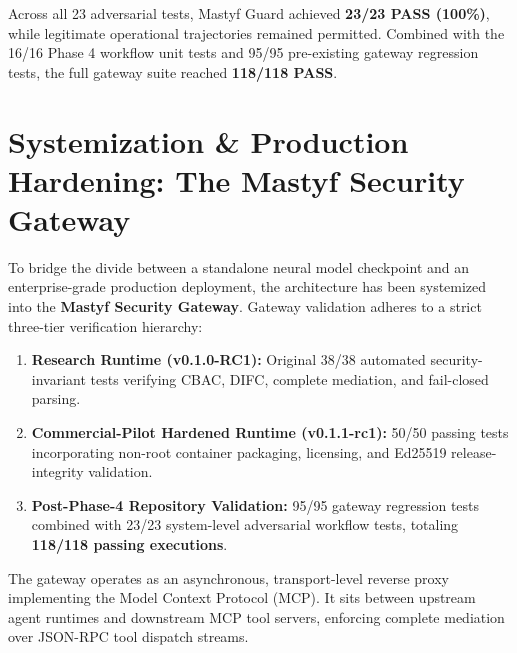 \documentclass[10pt,journal,compsoc]{IEEEtran}
\begin{document}
Across all 23 adversarial tests, Mastyf Guard achieved \textbf{23/23 PASS (100\%)}, while legitimate operational trajectories remained permitted. Combined with the 16/16 Phase 4 workflow unit tests and 95/95 pre-existing gateway regression tests, the full gateway suite reached \textbf{118/118 PASS}.

\section{Systemization \& Production Hardening: The Mastyf Security Gateway}
To bridge the divide between a standalone neural model checkpoint and an enterprise-grade production deployment, the architecture has been systemized into the \textbf{Mastyf Security Gateway}. Gateway validation adheres to a strict three-tier verification hierarchy:
\begin{enumerate}
    \item \textbf{Research Runtime (v0.1.0-RC1):} Original 38/38 automated security-invariant tests verifying CBAC, DIFC, complete mediation, and fail-closed parsing.
    \item \textbf{Commercial-Pilot Hardened Runtime (v0.1.1-rc1):} 50/50 passing tests incorporating non-root container packaging, licensing, and Ed25519 release-integrity validation.
    \item \textbf{Post-Phase-4 Repository Validation:} 95/95 gateway regression tests combined with 23/23 system-level adversarial workflow tests, totaling \textbf{118/118 passing executions}.
\end{enumerate}
The gateway operates as an asynchronous, transport-level reverse proxy implementing the Model Context Protocol (MCP). It sits between upstream agent runtimes and downstream MCP tool servers, enforcing complete mediation over JSON-RPC tool dispatch streams.
\end{document}
